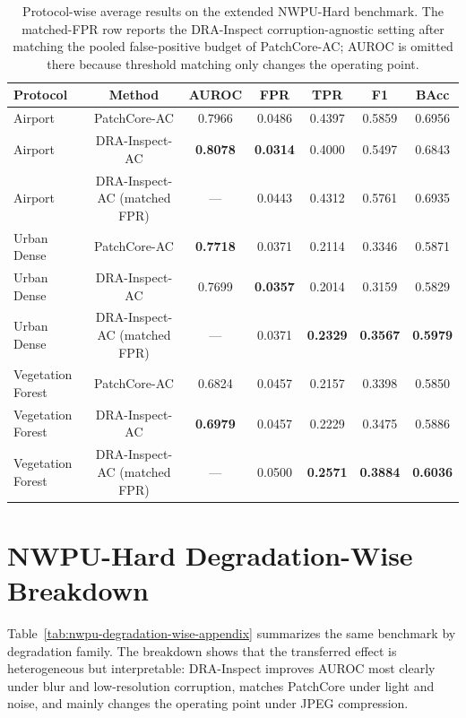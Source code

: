 \documentclass[remotesensing,article,submit,pdftex,moreauthors]{Definitions/mdpi}
\begin{document}
\begin{table}[!htbp]
\caption{Protocol-wise average results on the extended NWPU-Hard benchmark. The matched-FPR row reports the DRA-Inspect corruption-agnostic setting after matching the pooled false-positive budget of PatchCore-AC; AUROC is omitted there because threshold matching only changes the operating point.}
\label{tab:nwpu-protocol-wise-appendix}
\centering
\scriptsize
\setlength{\tabcolsep}{3.5pt}
\begin{tabular}{lcccccc}
\hline
Protocol & Method & AUROC & FPR & TPR & F1 & BAcc \\
\hline
Airport & PatchCore-AC & 0.7966 & 0.0486 & 0.4397 & 0.5859 & 0.6956 \\
Airport & DRA-Inspect-AC & \textbf{0.8078} & \textbf{0.0314} & 0.4000 & 0.5497 & 0.6843 \\
Airport & DRA-Inspect-AC (matched FPR) & --- & 0.0443 & 0.4312 & 0.5761 & 0.6935 \\
Urban Dense & PatchCore-AC & \textbf{0.7718} & 0.0371 & 0.2114 & 0.3346 & 0.5871 \\
Urban Dense & DRA-Inspect-AC & 0.7699 & \textbf{0.0357} & 0.2014 & 0.3159 & 0.5829 \\
Urban Dense & DRA-Inspect-AC (matched FPR) & --- & 0.0371 & \textbf{0.2329} & \textbf{0.3567} & \textbf{0.5979} \\
Vegetation Forest & PatchCore-AC & 0.6824 & 0.0457 & 0.2157 & 0.3398 & 0.5850 \\
Vegetation Forest & DRA-Inspect-AC & \textbf{0.6979} & 0.0457 & 0.2229 & 0.3475 & 0.5886 \\
Vegetation Forest & DRA-Inspect-AC (matched FPR) & --- & 0.0500 & \textbf{0.2571} & \textbf{0.3884} & \textbf{0.6036} \\
\hline
\end{tabular}
\end{table}

\section{NWPU-Hard Degradation-Wise Breakdown}
Table~\ref{tab:nwpu-degradation-wise-appendix} summarizes the same benchmark by degradation family. The breakdown shows that the transferred effect is heterogeneous but interpretable: DRA-Inspect improves AUROC most clearly under blur and low-resolution corruption, matches PatchCore under light and noise, and mainly changes the operating point under JPEG compression.
\end{document}
